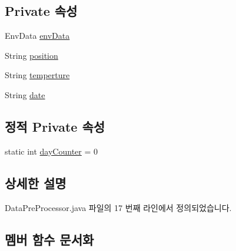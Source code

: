 \subsection*{Private 속성}
\begin{DoxyCompactItemize}
\item 
Env\+Data \mbox{\hyperlink{classcom_1_1github_1_1aites_1_1shlocalaites_1_1monitor_1_1_data_pre_processor_af8a0c4f55f04ec09d3c67c3a37de6bcc}{env\+Data}}
\item 
String \mbox{\hyperlink{classcom_1_1github_1_1aites_1_1shlocalaites_1_1monitor_1_1_data_pre_processor_a47fa72faec38e305008aac9ef4b46933}{position}}
\item 
String \mbox{\hyperlink{classcom_1_1github_1_1aites_1_1shlocalaites_1_1monitor_1_1_data_pre_processor_a130f82de42bf7738d4aef7fa8390fee8}{temperture}}
\item 
String \mbox{\hyperlink{classcom_1_1github_1_1aites_1_1shlocalaites_1_1monitor_1_1_data_pre_processor_a296f8772bf957a63e75168b49b620fed}{date}}
\end{DoxyCompactItemize}
\subsection*{정적 Private 속성}
\begin{DoxyCompactItemize}
\item 
static int \mbox{\hyperlink{classcom_1_1github_1_1aites_1_1shlocalaites_1_1monitor_1_1_data_pre_processor_a0c0990b68908b9c96b2a832d33fd3ac4}{day\+Counter}} = 0
\end{DoxyCompactItemize}


\subsection{상세한 설명}


Data\+Pre\+Processor.\+java 파일의 17 번째 라인에서 정의되었습니다.



\subsection{멤버 함수 문서화}
\mbox{\label{classcom_1_1github_1_1aites_1_1shlocalaites_1_1monitor_1_1_data_pre_processor_abff58cf7b97f2f77f6bf45d9c8d4b83b}} 
